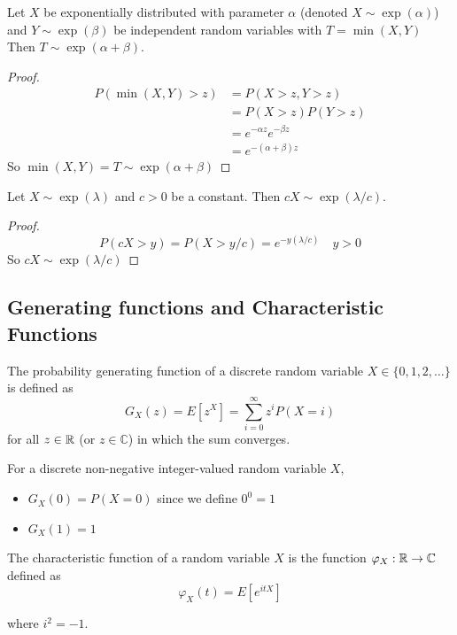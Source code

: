 \begin{theorem}\label{thm:exp_t_cond}
Let $X$ be exponentially distributed with parameter $\alpha$ (denoted $X \sim \exp(\alpha)$) and $Y \sim \exp(\beta)$ be independent random variables with $T = \min(X,Y)$
Then $T \sim \exp(\alpha + \beta)$.
\end{theorem}

\begin{proof}
\begin{align*}
    P(\min(X,Y) > z) &= P(X > z, Y > z)\\
    &= P(X > z) P(Y > z)\\
    &= e^{-\alpha z} e^{-\beta z}\\
    &= e^{-(\alpha + \beta) z}
\end{align*}
So $\min(X,Y) = T \sim \exp(\alpha + \beta)$
\end{proof}

\begin{theorem} \label{thm:exp_scaling}
Let $X \sim \exp(\lambda)$ and $c > 0$ be a constant.
Then $cX \sim \exp(\lambda/c)$.
\end{theorem}

\begin{proof}
$$
    P(cX > y) = P(X > y/c) = e^{-y (\lambda/c)} \quad y > 0
$$
So $cX \sim \exp(\lambda/c)$
\end{proof}

\subsection{Generating functions and Characteristic Functions}

\begin{defn}
The probability generating function of a discrete random variable $X \in \{0,1,2, \ldots\}$ is defined as
$$
G_X(z) = E[z^X] = \sum_{i = 0}^\infty z^i P(X = i)
$$
for all $z \in \mathbb{R}$ (or $z \in \mathbb C$) in which the sum converges.
\end{defn}

\begin{note}
For a discrete non-negative integer-valued random variable $X$,
\begin{itemize}
    \item $G_X(0) = P(X = 0)$ since we define $0^0 = 1$
    \item $G_X(1) = 1$
\end{itemize}
\end{note}

\begin{defn}
The characteristic function of a random variable $X$ is the function $\varphi_X : \mathbb{R} \to \mathbb C$ defined as
$$
\varphi_X(t) = E[e^{itX}]
$$

where $i^2 = -1$.
\end{defn}

